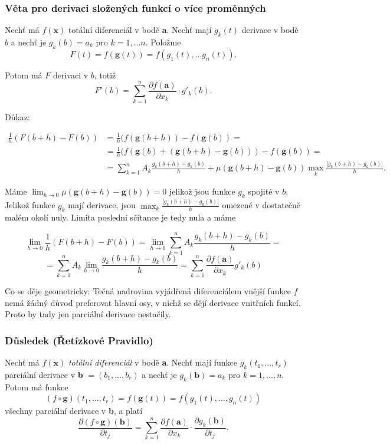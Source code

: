 \documentclass[../main.tex]{subfiles}
\begin{document}
\subsubsection{Věta pro derivaci složených funkcí o více proměnných}
\hspace{1.2mm}
Nechť má $f(\textbf{x})$ totální diferenciál v bodě \textbf{a}. Nechť mají $g_k(t)$ derivace v bodě $b$ a nechť je $g_k(b) = a_k$ pro 
$k = 1,...n.$ Položme
\[F(t) = f(\textbf{g}(t)) = f(g_1(t),...g_n(t)).\]

Potom má $F$ derivaci v $b$, totiž 
\[F'(b) = \sum^n_{k=1}\frac{\partial f(\textbf{a})}{\partial x_k} \cdot g'_k(b).\]

Důkaz:

\begin{align*} 
 \frac{1}{h} (F(b+h) - F(b)) &= \frac{1}{h}(f(\textbf{g}(b+h)) - f(\textbf{g}(b)) =  \\
 &=\frac{1}{h}(f(\textbf{g}(b) + (\textbf{g}(b+h) - \textbf{g}(b))) - f(\textbf{g}(b)) = \\
 &=\sum^n_{k=1}A_k\frac{g_k(b+h)-g_k(b)}{h} + \mu(\textbf{g}(b+h) - \textbf{g}(b)) \max_k\frac{|g_k(b+h)-g_k(b)|}{h}.
\end{align*}

Máme $\lim_{h \rightarrow 0} \mu(\textbf{g}(b+h)-\textbf{g}(b)) = 0$ jelikož jsou funkce $g_k$ spojité v $b$. 
Jelikož funkce $g_k$ mají derivace, jsou $\max_k \frac{|g_k(b+h) - g_k(b)|}{h}$ omezené v dostatečně malém okolí nuly. Limita 
poslední sčítance je tedy nula a máme

\[\lim_{h \rightarrow 0} \frac{1}{h}(F(b+h) - F(b)) = \lim_{h \rightarrow 0} \sum^n_{k = 1} A_k\frac{g_k(b+h)-g_k(b)}{h} = \]
\[= \sum^n_{k = 1}A_k\lim_{h \rightarrow 0} \frac{g_k(b+h) - g_k(b)}{h} = \sum^n_{k = 1}\frac{\partial f(\textbf{a})}{\partial x_k}g'_k(b)\]

\hspace{1.2mm}
Co se děje geometricky: Tečná nadrovina vyjádřená diferenciálem vnější funkce $f$ nemá žádný důvod preferovat hlavní osy, v nichž se 
dějí derivace vnitřních funkcí. Proto by tady jen parciální derivace nestačily.
\noindent

\subsubsection{Důsledek (Řetízkové Pravidlo)}
\hspace{1.2mm}
Nechť má $f(\textbf{x})$ \textit{totální diferenciál} v bodě \textbf{a}. Nechť mají funkce $g_k(t_1,...,t_r)$ parciální 
derivace v \textbf{b} $= (b_1,...,b_r)$ a nechť je $g_k(\textbf{b}) = a_k$ pro $k = 1,...,n.$ Potom má funkce
\[(f\circ \textbf{g})(t_1,...,t_r) = f(\textbf{g}(t)) = f(g_1(t),...,g_n(t))\]
všechny parciální derivace v \textbf{b}, a platí 
\[\frac{\partial (f \circ \textbf{g})(\textbf{b})}{\partial t_j} = \sum^n_{k=1}\frac{\partial f(\textbf{a})}{\partial x_k}
\cdot \frac{\partial g_k(\textbf{b})}{\partial t_j}.\]
\end{document}

